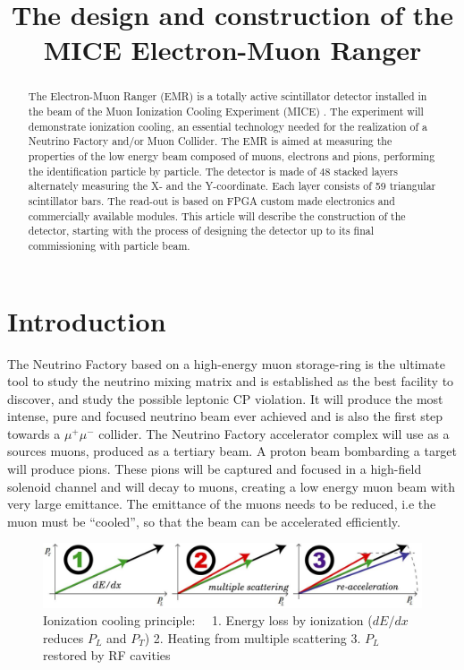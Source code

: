 \documentclass[a4paper,11pt]{article}
\title{The design and construction of the MICE Electron-Muon Ranger}
\author{}
\begin{document}
\maketitle

\begin{abstract}
The Electron-Muon Ranger (EMR) is a totally active scintillator detector installed in the beam of the Muon Ionization
Cooling Experiment (MICE) \cite{MICEweb}. The experiment will demonstrate ionization cooling, an essential technology needed
for the realization of a Neutrino Factory and/or Muon Collider. The EMR is aimed at measuring the properties of the low
energy beam composed of muons, electrons and pions, performing the identification particle by particle. The detector is
made of 48 stacked layers alternately measuring the X- and the Y-coordinate. Each layer consists of 59 triangular
scintillator bars. The read-out is based on FPGA custom made electronics and commercially available modules. This article
will describe the construction of the detector, starting with the process of designing the detector up to its final
commissioning with particle beam.
\end{abstract}

\section{Introduction}
The Neutrino Factory based on a high-energy muon storage-ring is the ultimate tool to study the neutrino mixing matrix
and is established as the best facility to discover, and study the possible leptonic CP violation. It will produce the
most intense, pure and focused neutrino beam ever achieved and is also the first step towards a $\mu^+ \mu^-$ collider.
The Neutrino Factory accelerator complex will use as a sources muons, produced as a tertiary beam. A proton beam bombarding
a target will produce pions. These pions will be captured and focused in a high-field solenoid channel and will decay
to muons, creating a low energy muon beam with very large emittance.  The emittance of the muons needs to be reduced,
i.e the muon must be “cooled”, so that the beam can be accelerated efficiently.

\begin{figure}[htb]
 \includegraphics[width=1.\linewidth]{./ICool.png}
 \caption{Ionization cooling principle: \ \ 1. Energy loss by ionization ($dE/dx$ reduces $P_L$ and $P_T$)
    2. Heating from multiple scattering
    3. $P_L$ restored by RF cavities    
   }
 \label{icool}     
\end{figure}
\end{document}
